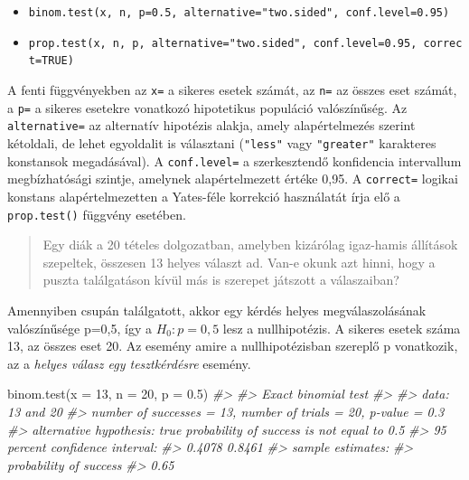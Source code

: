 \documentclass[
]{book}
\newenvironment{Shaded}{\begin{snugshade}}{\end{snugshade}}
\newcommand{\AttributeTok}[1]{\textcolor[rgb]{0.77,0.63,0.00}{#1}}
\newcommand{\CommentTok}[1]{\textcolor[rgb]{0.56,0.35,0.01}{\textit{#1}}}
\newcommand{\DecValTok}[1]{\textcolor[rgb]{0.00,0.00,0.81}{#1}}
\newcommand{\FloatTok}[1]{\textcolor[rgb]{0.00,0.00,0.81}{#1}}
\newcommand{\FunctionTok}[1]{\textcolor[rgb]{0.00,0.00,0.00}{#1}}
\newcommand{\NormalTok}[1]{#1}
\providecommand{\tightlist}{%
  \setlength{\itemsep}{0pt}\setlength{\parskip}{0pt}}
\begin{document}
\begin{itemize}
\tightlist
\item
  \texttt{binom.test(x,\ n,\ p=0.5,\ alternative="two.sided",\ conf.level=0.95)}
\item
  \texttt{prop.test(x,\ n,\ p,\ alternative="two.sided",\ conf.level=0.95,\ correct=TRUE)}
\end{itemize}

A fenti függvényekben az \texttt{x=} a sikeres esetek számát, az \texttt{n=} az összes eset számát, a \texttt{p=} a sikeres esetekre vonatkozó hipotetikus populáció valószínűség. Az \texttt{alternative=} az alternatív hipotézis alakja, amely alapértelmezés szerint kétoldali, de lehet egyoldalit is választani (\texttt{"less"} vagy \texttt{"greater"} karakteres konstansok megadásával). A \texttt{conf.level=} a szerkesztendő konfidencia intervallum megbízhatósági szintje, amelynek alapértelmezett értéke 0,95. A \texttt{correct=} logikai konstans alapértelmezetten a Yates-féle korrekció használatát írja elő a \texttt{prop.test()} függvény esetében.

\begin{quote}
Egy diák a 20 tételes dolgozatban, amelyben kizárólag igaz-hamis állítások szepeltek, összesen 13 helyes választ ad. Van-e okunk azt hinni, hogy a puszta találgatáson kívül más is szerepet játszott a válaszaiban?
\end{quote}

Amennyiben csupán találgatott, akkor egy kérdés helyes megválaszolásának valószínűsége p=0,5, így a \(H_0: p=0,5\) lesz a nullhipotézis. A sikeres esetek száma 13, az összes eset 20. Az esemény amire a nullhipotézisban szereplő p vonatkozik, az a \emph{helyes válasz egy tesztkérdésre} esemény.

\begin{Shaded}
\begin{Highlighting}[]
\FunctionTok{binom.test}\NormalTok{(}\AttributeTok{x =} \DecValTok{13}\NormalTok{, }\AttributeTok{n =} \DecValTok{20}\NormalTok{, }\AttributeTok{p =} \FloatTok{0.5}\NormalTok{)}
\CommentTok{\#\textgreater{} }
\CommentTok{\#\textgreater{}  Exact binomial test}
\CommentTok{\#\textgreater{} }
\CommentTok{\#\textgreater{} data:  13 and 20}
\CommentTok{\#\textgreater{} number of successes = 13, number of trials = 20, p{-}value = 0.3}
\CommentTok{\#\textgreater{} alternative hypothesis: true probability of success is not equal to 0.5}
\CommentTok{\#\textgreater{} 95 percent confidence interval:}
\CommentTok{\#\textgreater{}  0.4078 0.8461}
\CommentTok{\#\textgreater{} sample estimates:}
\CommentTok{\#\textgreater{} probability of success }
\CommentTok{\#\textgreater{}                   0.65}
\end{Highlighting}
\end{Shaded}
\end{document}
